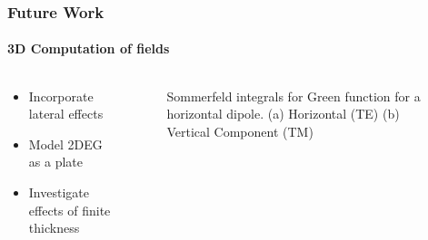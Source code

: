 \documentclass[mathserif,18pt,xcolor=table]{beamer}
\begin{document}
\begin{frame}
\frametitle{Future Work}
\framesubtitle{3D Computation of fields}
\begin{columns}[T] %
  \begin{column}{.5\textwidth}
    \begin{itemize}
      \item Incorporate lateral effects
      \item Model 2DEG as a plate
      \item Investigate effects of finite thickness
    \end{itemize}
  \end{column}
  \begin{column}[T]{.5\textwidth}
    \begin{figure}
      \vspace*{-2cm}
      \subfloat{
      \label{fig:eps_Ga}}
      \vspace*{0cm}
      \subfloat{
      \label{fig:eps_Sto}}
      \caption{Sommerfeld integrals for Green function for a horizontal dipole. (a) Horizontal (TE) (b) Vertical Component (TM)}
    \end{figure}
    \end{column}%
\end{columns}
\end{frame}
\end{document}
